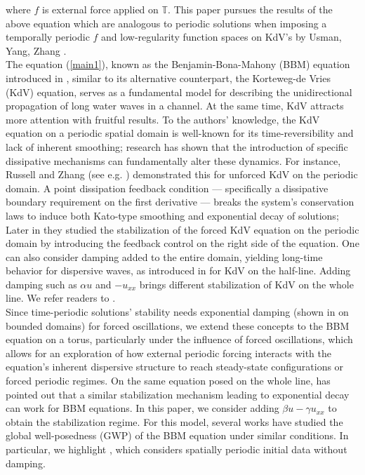 \documentclass[10pt,a4paper,final]{article}
\numberwithin{equation}{section}
\newcommand{\Gb}{\beta}
\newcommand{\Gg}{\gamma}
\begin{document}
\noindent where $f$ is external force applied on $\mathbb{T}$. This paper pursues the results of the above equation which are analogous to periodic solutions when imposing a temporally periodic $f$ and low-regularity function spaces on KdV's by Usman, Yang, Zhang \cites{UsmanZ2, Yang, Yang2}. \\

The equation (\ref{main1}), known as the Benjamin-Bona-Mahony (BBM) equation introduced in \cite{BBM}, similar to its alternative counterpart, the Korteweg-de Vries (KdV) equation, serves as a fundamental model for describing the unidirectional propagation of long water waves in a channel. At the same time, KdV attracts more attention with fruitful results. To the authors' knowledge, the KdV equation on a periodic spatial domain is well-known for its time-reversibility and lack of inherent smoothing; research has shown that the introduction of specific dissipative mechanisms can fundamentally alter these dynamics. For instance, Russell and Zhang (see e.g. \cite{Russell}) demonstrated this for unforced KdV on the periodic domain. A point dissipation feedback condition — specifically a dissipative boundary requirement on the first derivative — breaks the system's conservation laws to induce both Kato-type smoothing and exponential decay of solutions; Later in \cite{RZ} they studied the stabilization of the forced KdV equation on the periodic domain by introducing the feedback control on the right side of the equation. One can also consider damping added to the entire domain, yielding long-time behavior for dispersive waves, as introduced in \cite{BSZ2} for KdV on the half-line. Adding damping such as $\alpha u$ and $-u_{xx}$ brings different stabilization of KdV on the whole line. We refer readers to \cite{BW}. \\

Since time-periodic solutions' stability needs exponential damping (shown in \cite{UsmanZ2, WZ} on bounded domains) for forced oscillations, we extend these concepts to the BBM equation on a torus, particularly under the influence of forced oscillations, which allows for an exploration of how external periodic forcing interacts with the equation's inherent dispersive structure to reach steady-state configurations or forced periodic regimes. On the same equation posed on the whole line, \cite{Amick} has pointed out that a similar stabilization mechanism leading to exponential decay can work for BBM equations. In this paper, we consider adding $\Gb u - \Gg u_{xx}$ to obtain the stabilization regime. For this model, several works have studied the global well-posedness (GWP) of the BBM equation under similar conditions. In particular, we highlight \cite{HChen}, which considers spatially periodic initial data without damping.
\end{document}
